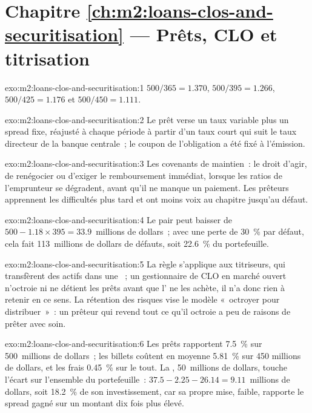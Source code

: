 \section*{Chapitre \ref{ch:m2:loans-clos-and-securitisation} --- Prêts, CLO et titrisation}

\begin{solution}{exo:m2:loans-clos-and-securitisation:1}
$500/365 = 1.370$, $500/395 = 1.266$, $500/425 = 1.176$ et $500/450 = 1.111$.
\end{solution}

\begin{solution}{exo:m2:loans-clos-and-securitisation:2}
Le prêt verse un taux variable plus un spread fixe, réajusté à chaque période à partir d'un taux court qui suit le taux directeur
de la banque centrale~; le coupon de l'obligation a été fixé à l'émission.
\end{solution}

\begin{solution}{exo:m2:loans-clos-and-securitisation:3}
Les covenants de maintien~: le droit d'agir, de renégocier ou d'exiger le remboursement immédiat, lorsque les
ratios de l'emprunteur se dégradent, avant qu'il ne manque un paiement. Les prêteurs apprennent
les difficultés plus tard et ont moins voix au chapitre jusqu'au défaut.
\end{solution}

\begin{solution}{exo:m2:loans-clos-and-securitisation:4}
Le pair peut baisser de $500 - 1.18 \times 395 = 33.9$~millions de dollars~; avec une perte de 30~\% par
défaut, cela fait 113~millions de dollars de défauts, soit 22.6~\% du portefeuille.
\end{solution}

\begin{solution}{exo:m2:loans-clos-and-securitisation:5}
La règle s'applique aux titriseurs, qui transfèrent des actifs dans une ~; un
gestionnaire de CLO en marché ouvert n'octroie ni ne détient les prêts avant que l' ne les achète, il n'a donc rien à retenir en ce sens.
La rétention des risques vise le modèle «~octroyer pour distribuer~»~: un prêteur qui revend
tout ce qu'il octroie a peu de raisons de
prêter avec soin.
\end{solution}

\begin{solution}{exo:m2:loans-clos-and-securitisation:6}
Les prêts rapportent 7.5~\% sur 500~millions de dollars~; les billets coûtent en moyenne 5.81~\% sur 450
millions de dollars, et les frais 0.45~\% sur le tout. La , 50~millions de dollars, touche
l'écart sur l'ensemble du portefeuille~: $37.5 - 2.25 - 26.14 = 9.11$~millions de dollars, soit 18.2~\% de
son investissement, car sa propre mise, faible, rapporte le spread gagné sur un montant dix fois plus élevé.
\end{solution}

